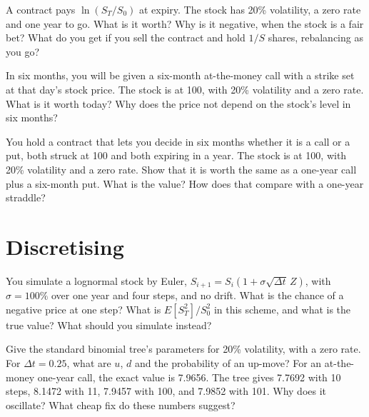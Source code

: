 \begin{question}\label{iq:iv2:pricing-and-numerics:22}
A contract pays $\ln(S_T/S_0)$ at expiry. The stock has 20\% volatility, a zero rate and one year to go. What is it worth? Why is it negative, when the stock is a fair bet? What do you get if you sell the contract and hold $1/S$ shares, rebalancing as you go?
\end{question}

\begin{question}\label{iq:iv2:pricing-and-numerics:23}
In six months, you will be given a six-month at-the-money call with a strike set at that day's stock price. The stock is at 100, with 20\% volatility and a zero rate. What is it worth today? Why does the price not depend on the stock's level in six months?
\end{question}

\begin{question}\label{iq:iv2:pricing-and-numerics:24}
You hold a contract that lets you decide in six months whether it is a call or a put, both struck at 100 and both expiring in a year. The stock is at 100, with 20\% volatility and a zero rate. Show that it is worth the same as a one-year call plus a six-month put. What is the value? How does that compare with a one-year straddle?
\end{question}

\section{Discretising}

\begin{question}\label{iq:iv2:pricing-and-numerics:25}
You simulate a lognormal stock by Euler, $S_{i+1} = S_i(1 + \sigma\sqrt{\Delta t}\,Z)$, with $\sigma = 100\%$ over one year and four steps, and no drift. What is the chance of a negative price at one step? What is $E[S_T^2]/S_0^2$ in this scheme, and what is the true value? What should you simulate instead?
\end{question}

\begin{question}\label{iq:iv2:pricing-and-numerics:26}
Give the standard binomial tree's parameters for 20\% volatility, with a zero rate. For $\Delta t = 0.25$, what are $u$, $d$ and the probability of an up-move? For an at-the-money one-year call, the exact value is 7.9656. The tree gives 7.7692 with 10 steps, 8.1472 with 11, 7.9457 with 100, and 7.9852 with 101. Why does it oscillate? What cheap fix do these numbers suggest?
\end{question}

